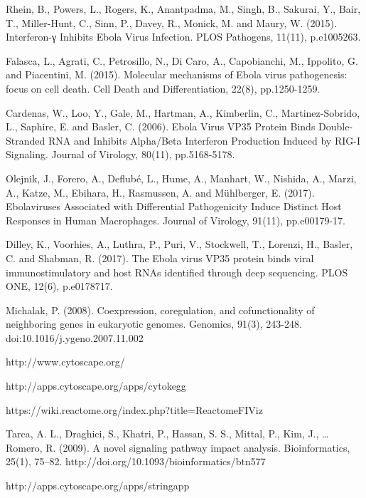 \documentclass[twocolumn]{article}
\begin{document}
\begin{thebibliography}{9}
	Rhein, B., Powers, L., Rogers, K., Anantpadma, M., Singh, B., Sakurai, Y., Bair, T., Miller-Hunt, C., Sinn, P., Davey, R., Monick, M. and Maury, W. (2015). Interferon-γ Inhibits Ebola Virus Infection. PLOS Pathogens, 11(11), p.e1005263.
	
	Falasca, L., Agrati, C., Petrosillo, N., Di Caro, A., Capobianchi, M., Ippolito, G. and Piacentini, M. (2015).
	 Molecular mechanisms of Ebola virus pathogenesis: focus on cell death. Cell Death and Differentiation, 22(8), pp.1250-1259.
	 
	Cardenas, W., Loo, Y., Gale, M., Hartman, A., Kimberlin, C., Martinez-Sobrido, L., Saphire, E. and Basler, C. (2006). Ebola Virus VP35 Protein Binds Double-Stranded RNA and Inhibits Alpha/Beta Interferon Production Induced by RIG-I Signaling. Journal of Virology, 80(11), pp.5168-5178.
	
	Olejnik, J., Forero, A., Deflubé, L., Hume, A., Manhart, W., Nishida, A., Marzi, A., Katze, M., Ebihara, H., Rasmussen, A. and Mühlberger, E. (2017). Ebolaviruses Associated with Differential Pathogenicity Induce Distinct Host Responses in Human Macrophages. Journal of Virology, 91(11), pp.e00179-17.
	
	Dilley, K., Voorhies, A., Luthra, P., Puri, V., Stockwell, T., Lorenzi, H., Basler, C. and Shabman, R. (2017). The Ebola virus VP35 protein binds viral immunostimulatory and host RNAs identified through deep sequencing. PLOS ONE, 12(6), p.e0178717.
	

	Michalak, P. (2008). Coexpression, coregulation, and cofunctionality of neighboring genes in eukaryotic genomes. Genomics, 91(3), 243-248. doi:10.1016/j.ygeno.2007.11.002 
	
	http://www.cytoscape.org/
	
	http://apps.cytoscape.org/apps/cytokegg
	
	https://wiki.reactome.org/index.php?title=ReactomeFIViz
	
	Tarca, A. L., Draghici, S., Khatri, P., Hassan, S. S., Mittal, P., Kim, J., … Romero, R. (2009). A novel signaling pathway impact analysis. Bioinformatics, 25(1), 75–82. http://doi.org/10.1093/bioinformatics/btn577
	
	http://apps.cytoscape.org/apps/stringapp
	
	
\end{thebibliography}
\end{document}

